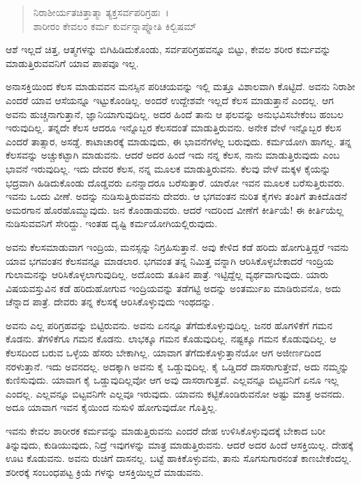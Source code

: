 \begin{verse}
ನಿರಾಶೀರ್ಯತಚಿತ್ತಾತ್ಮಾ ತ್ಯಕ್ತಸರ್ವಪರಿಗ್ರಹಃ~।\\ಶಾರೀರಂ ಕೇವಲಂ ಕರ್ಮ ಕುರ್ವನ್ನಾಪ್ನೋತಿ ಕಿಲ್ಬಿಷಮ್ 
\end{verse}

{\small ಆಶೆ ಇಲ್ಲದೆ ಚಿತ್ತ, ಆತ್ಮಗಳನ್ನು ಬಿಗಿಹಿಡಿದುಕೊಂಡು, ಸರ್ವಪರಿಗ್ರಹವನ್ನೂ ಬಿಟ್ಟು, ಕೇವಲ ಶರೀರ ಕರ್ಮವನ್ನು ಮಾಡುತ್ತಿರುವವನಿಗೆ ಯಾವ ಪಾಪವೂ ಇಲ್ಲ.}

ಅನಾಸಕ್ತಿಯಿಂದ ಕೆಲಸ ಮಾಡುವವನ ಮನಸ್ಸಿನ ಪರಿಚಯವನ್ನು ಇಲ್ಲಿ ಮತ್ತೂ ವಿಶಾಲವಾಗಿ ಕೊಟ್ಟಿದೆ. ಅವನು ನಿರಾಶೀ ಎಂದರೆ ಯಾವ ಆಸೆಯನ್ನೂ ಇಟ್ಟುಕೊಂಡಿಲ್ಲ. ಅಂದರೆ ಉದ್ದೇಶವೇ ಇಲ್ಲದೆ ಕೆಲಸ ಮಾಡುತ್ತಾನೆ ಎಂದಲ್ಲ. ಆಗ ಅವನು ಹುಚ್ಚನಾಗುತ್ತಾನೆ, ಜ್ಞಾನಿಯಾಗುವುದಿಲ್ಲ. ಅದರ ಹಿಂದೆ ತಾನು ಆ ಫಲವನ್ನು ಅನುಭವಿಸಬೇಕೆಂಬ ಹಂಬಲ ಇರುವುದಿಲ್ಲ. ತನ್ನದೇ ಕೆಲಸ ಆದರೂ ಇನ್ನೊಬ್ಬರ ಕೆಲಸದಂತೆ ಮಾಡುತ್ತಿರುವನು. ಅನೇಕ ವೇಳೆ ಇನ್ನೊಬ್ಬರ ಕೆಲಸ ಎಂದರೆ ತಾತ್ಸಾರ, ಅಸಡ್ಡೆ. ಕಾಟಾಚಾರಕ್ಕೆ ಮಾಡುವುದು, ಈ ಭಾವನೆಗಳೆಲ್ಲ ಬರುವುದು. ಕರ್ಮಯೋಗಿ ಹಾಗಲ್ಲ. ತನ್ನ ಕೆಲಸವನ್ನು ಅಚ್ಚುಕಟ್ಟಾಗಿ ಮಾಡುವನು. ಆದರೆ ಅದರ ಹಿಂದೆ ಇದು ನನ್ನ ಕೆಲಸ, ನಾನು ಮಾಡುತ್ತಿರುವುದು ಎಂಬ ಭಾವನೆ ಇರುವುದಿಲ್ಲ. ಇದು ದೇವರ ಕೆಲಸ, ನನ್ನ ಮೂಲಕ ಮಾಡುತ್ತಿರುವನು. ಕೆಲವು ವೇಳೆ ಮಕ್ಕಳ ಕೈಯನ್ನು ಭದ್ರವಾಗಿ ಹಿಡಿದುಕೊಂಡು ದೊಡ್ಡವರು ಏನನ್ನಾದರೂ ಬರೆಸುತ್ತಾರೆ. ಯಾರೋ ಇವನ ಮೂಲಕ ಬರೆಸುತ್ತಿರುವರು. ಇವನು ಒಂದು ವೀಣೆ. ಅದನ್ನು ನುಡಿಸುತ್ತಿರುವವನು ದೇವರು. ಆ ಭಗವಂತನ ನುರಿತ ಕೈಗಳು ತಂತಿಗೆ ತಾಕಿದೊಡನೆ ಅಮರಗಾನ ಹೊರಹೊಮ್ಮುವುದು. ಜನ ಕೊಂಡಾಡುವರು. ಆದರೆ ಇದರಿಂದ ವೀಣೆಗೆ ಕೀರ್ತಿಯೆ! ಈ ಕೀರ್ತಿಯೆಲ್ಲ ನುಡಿಸುವವನಿಗೆ ಸೇರಿದ್ದು. ಇಂತಹ ದೃಷ್ಟಿ ಕರ್ಮಯೋಗಿಯಲ್ಲಿರುವುದು.

ಅವನು ಕೆಲಸಮಾಡುವಾಗ ಇಂದ್ರಿಯ, ಮನಸ್ಸನ್ನು ನಿಗ್ರಹಿಸುತ್ತಾನೆ. ಅವು ಕೇಳಿದ ಕಡೆ ಹರಿದು ಹೋಗುತ್ತಿದ್ದರೆ ಇವನು ಯಾವ ಭಗವಂತನ ಕೆಲಸವನ್ನೂ ಮಾಡಲಾರ. ಭಗವಂತ ತನ್ನ ನಿಮಿತ್ತ ವನ್ನಾಗಿ ಆರಿಸಿಕೊಳ್ಳಬೇಕಾದರೆ ಇಂದ್ರಿಯ ಗುಲಾಮನನ್ನು ಆರಿಸಿಕೊಳ್ಳಲಾಗುವುದಿಲ್ಲ. ಅದೊಂದು ತೂತಿನ ಪಾತ್ರೆ. ಇಟ್ಟಿದ್ದೆಲ್ಲ ವ್ಯರ್ಥವಾಗುವುದು. ಯಾರು ವಿಷಯವಸ್ತುವಿನ ಕಡೆ ಹರಿದುಹೋಗುವ ಇಂದ್ರಿಯವನ್ನು ತಡೆಗಟ್ಟಿ ಅದನ್ನು ಅಂತರ್ಮುಖ ಮಾಡಿರುವನೊ, ಅದು ಚೆನ್ನಾದ ಪಾತ್ರೆ. ದೇವರು ತನ್ನ ಕೆಲಸಕ್ಕೆ ಆರಿಸಿಕೊಳ್ಳುವುದು ಇಂಥದನ್ನು.

ಅವನು ಎಲ್ಲ ಪರಿಗ್ರಹವನ್ನು ಬಿಟ್ಟಿರುವನು. ಅವನು ಏನನ್ನೂ ತೆಗೆದುಕೊಳ್ಳುವುದಿಲ್ಲ. ಜನರ ಹೊಗಳಿಕೆಗೆ ಗಮನ ಕೊಡನು. ತೆಗಳಿಕೆಗೂ ಗಮನ ಕೊಡನು. ಲಾಭಕ್ಕೂ ಗಮನ ಕೊಡುವುದಿಲ್ಲ. ನಷ್ಟಕ್ಕೂ ಗಮನ ಕೊಡುವುದಿಲ್ಲ. ಆ ಕೆಲಸದಿಂದ ಬರುವ ಒಳ್ಳೆಯ ಹೆಸರು ಬೇಕಾಗಿಲ್ಲ. ಯಾವಾಗ ತೆಗೆದುಕೊಳ್ಳುತ್ತಾನೆಯೋ ಆಗ ಅಜೀರ್ಣದಿಂದ ನರಳುತ್ತಾನೆ. ಇದು ಅವನದಲ್ಲ. ಅದಕ್ಕಾಗಿ ಅವನು ಕೈ ಒಡ್ಡುವುದಿಲ್ಲ. ಕೈ ಒಡ್ಡಿದರೆ ದಾಸರಾಗುತ್ತೇವೆ, ಅದು ನಮ್ಮನ್ನು ಕುಣಿಸುವುದು. ಯಾವಾಗ ಕೈ ಒಡ್ಡುವುದಿಲ್ಲವೋ ಆಗ ಅವು ದಾಸರಾಗುತ್ತವೆ. ಎಲ್ಲವನ್ನೂ ಬಿಟ್ಟವನಿಗೆ ಏನೂ ಇಲ್ಲ ಎಂದಲ್ಲ. ಎಲ್ಲವನ್ನೂ ಬಿಟ್ಟವನಿಗೇ ಎಲ್ಲವೂ ಇರುವುದು. ಯಾವನು ಕಟ್ಟಿಕೊಂಡಿರುವನೋ ಅಷ್ಟು ಮಾತ್ರ ಅವನದು. ಅದೂ ಯಾವಾಗ ಇವನ ಕೈಯಿಂದ ನುಸುಳಿ ಹೋಗುವುದೋ ಗೊತ್ತಿಲ್ಲ.

ಇವನು ಕೇವಲ ಶಾರೀರಕ ಕರ್ಮವನ್ನು ಮಾಡುತ್ತಿರುವನು ಎಂದರೆ ದೇಹ ಉಳಿಸಿಕೊಳ್ಳುವುದಕ್ಕೆ ಬೇಕಾದ ಬರೀ ತಿನ್ನುವುದು, ಕುಡಿಯುವುದು, ನಿದ್ರೆ ಇವುಗಳನ್ನು ಮಾತ್ರ ಮಾಡುತ್ತಿರುವನು. ಆದರೆ ಅದರ ಹಿಂದೆ ಆಸಕ್ತಿಯಿಲ್ಲ. ದೇಹಕ್ಕೆ ಊಟ ಕೊಡುವನು. ಅವನು ರುಚಿಗೆ ದಾಸನಲ್ಲ. ಬಟ್ಟೆ ಹಾಕಿಕೊಳ್ಳುವನು, ತಾನು ಸೊಗಸುಗಾರನಂತೆ ಕಾಣಬೇಕೆಂದಲ್ಲ. ಶರೀರಕ್ಕೆ ಸಂಬಂಧಪಟ್ಟ ಕ್ರಿಯೆ ಗಳನ್ನು ಆಸಕ್ತಿಯಿಲ್ಲದೆ ಮಾಡುವನು.

